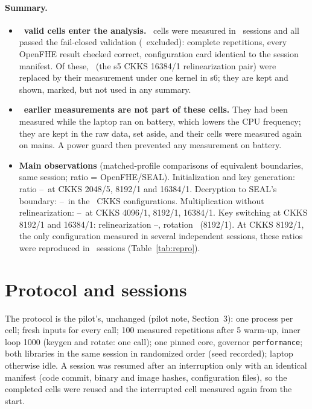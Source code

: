 \documentclass[11pt]{article}
\begin{document}
\paragraph{Summary.}
\begin{itemize}[leftmargin=*, itemsep=2pt]
  \item \textbf{\nUsed\ valid cells enter the analysis.} \nCells\ cells were measured in \nSessions\ sessions and all passed the fail-closed validation (\nExcluded\ excluded): complete repetitions, every OpenFHE result checked correct, configuration card identical to the session manifest. Of these, \nSuperseded\ (the s5 CKKS 16384/1 relinearization pair) were replaced by their measurement under one kernel in s6; they are kept and shown, marked, but not used in any summary.
  \item \textbf{\nSetAside\ earlier measurements are not part of these cells.} They had been measured while the laptop ran on battery, which lowers the CPU frequency; they are kept in the raw data, set aside, and their cells were measured again on mains. A power guard then prevented any measurement on battery.
  \item \textbf{Main observations} (matched-profile comparisons of equivalent boundaries, same session; ratio = OpenFHE/SEAL). Initialization and key generation: ratio \ratioMinkeygen--\ratioMaxkeygen\ at CKKS 2048/5, 8192/1 and 16384/1. Decryption to SEAL's boundary: \ratioMinckksdecrypt--\ratioMaxckksdecrypt\ in the \ratioNckksdecrypt\ CKKS configurations. Multiplication without relinearization: \ratioMinmultiply--\ratioMaxmultiply\ at CKKS 4096/1, 8192/1, 16384/1. Key switching at CKKS 8192/1 and 16384/1: relinearization \ratioMinrelinearize--\ratioMaxrelinearize, rotation \ratioMinrotate\ (8192/1). At CKKS 8192/1, the only configuration measured in several independent sessions, these ratios were reproduced in \nRepSessions\ sessions (Table~\ref{tab:repro}).
\end{itemize}

\section{Protocol and sessions}

The protocol is the pilot's, unchanged (pilot note, Section~3): one process per cell; fresh inputs for every call; 100 measured repetitions after 5 warm-up, inner loop 1000 (keygen and rotate: one call); one pinned core, governor \texttt{performance}; both libraries in the same session in randomized order (seed recorded); laptop otherwise idle. A session was resumed after an interruption only with an identical manifest (code commit, binary and image hashes, configuration files), so the completed cells were reused and the interrupted cell measured again from the start.
\end{document}
